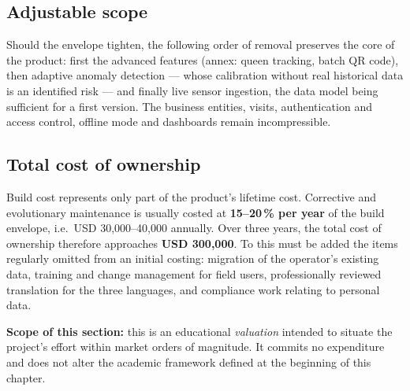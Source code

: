 \subsection{Adjustable scope}
Should the envelope tighten, the following order of removal preserves the core of
the product: first the advanced features (annex: queen tracking, batch QR code),
then adaptive anomaly detection --- whose calibration without real historical
data is an identified risk --- and finally live sensor ingestion, the data model
being sufficient for a first version. The business entities, visits,
authentication and access control, offline mode and dashboards remain
incompressible.

\subsection{Total cost of ownership}
Build cost represents only part of the product's lifetime cost. Corrective and
evolutionary maintenance is usually costed at \textbf{15--20\,\% per year} of the
build envelope, i.e.\ USD 30,000--40,000 annually. Over three years, the total
cost of ownership therefore approaches \textbf{USD 300,000}. To this must be
added the items regularly omitted from an initial costing: migration of the
operator's existing data, training and change management for field users,
professionally reviewed translation for the three languages, and compliance work
relating to personal data.

\begin{encadre}
\textbf{Scope of this section:} this is an educational \emph{valuation} intended
to situate the project's effort within market orders of magnitude. It commits no
expenditure and does not alter the academic framework defined at the beginning of
this chapter.
\end{encadre}
